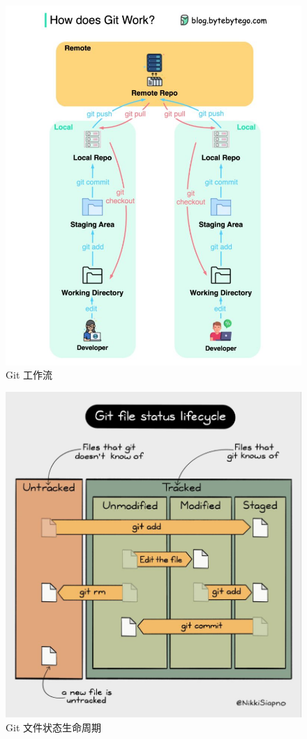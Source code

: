\documentclass{ctexart}
\begin{document}
\begin{figure}[htbp]
    \includegraphics[scale = 0.28]{pictures/05.jpg}
    \caption{Git 工作流}
\end{figure}
\begin{figure}[htbp]
    \centering
    \includegraphics[scale = 0.5]{pictures/04.jpg}
    \caption{Git 文件状态生命周期}
\end{figure}
\end{document}
